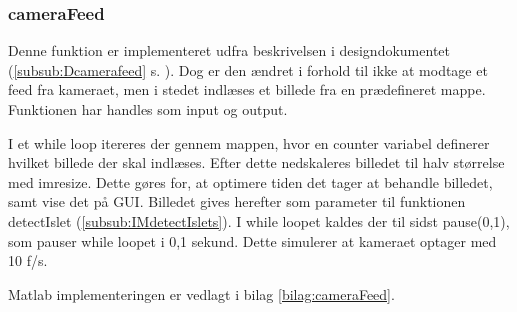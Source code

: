 \newpage
\subsubsection{cameraFeed} \label{subsub:camfeed}
Denne funktion er implementeret udfra beskrivelsen i designdokumentet (\ref{subsub:Dcamerafeed} s. \pageref{subsub:Dcamerafeed}). Dog er den ændret i forhold til ikke at modtage et feed fra kameraet, men i stedet indlæses et billede fra en prædefineret mappe. 
Funktionen har handles som input og output. 

I et while loop itereres der gennem mappen, hvor en counter variabel definerer hvilket billede der skal indlæses. Efter dette nedskaleres billedet til halv størrelse med imresize. Dette gøres for, at optimere tiden det tager at behandle billedet, samt vise det på GUI. Billedet gives herefter som parameter til funktionen detectIslet (\ref{subsub:IMdetectIslets}). I while loopet kaldes der til sidst pause(0,1), som pauser while loopet i 0,1 sekund. Dette simulerer at kameraet optager med 10 f/s. 

Matlab implementeringen er vedlagt i bilag \ref{bilag:cameraFeed}.